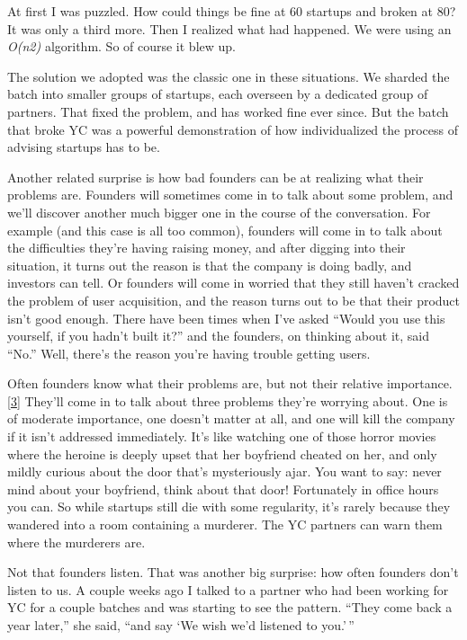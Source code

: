 At first I was puzzled. How could things be fine at 60 startups and
broken at 80? It was only a third more. Then I realized what had
happened. We were using an \emph{O(n2)} algorithm. So of course it blew
up.

The solution we adopted was the classic one in these situations. We
sharded the batch into smaller groups of startups, each overseen by a
dedicated group of partners. That fixed the problem, and has worked fine
ever since. But the batch that broke YC was a powerful demonstration of
how individualized the process of advising startups has to be.

Another related surprise is how bad founders can be at realizing what
their problems are. Founders will sometimes come in to talk about some
problem, and we'll discover another much bigger one in the course of the
conversation. For example (and this case is all too common), founders
will come in to talk about the difficulties they're having raising
money, and after digging into their situation, it turns out the reason
is that the company is doing badly, and investors can tell. Or founders
will come in worried that they still haven't cracked the problem of user
acquisition, and the reason turns out to be that their product isn't
good enough. There have been times when I've asked ``Would you use this
yourself, if you hadn't built it?'' and the founders, on thinking about
it, said ``No.'' Well, there's the reason you're having trouble getting
users.

Often founders know what their problems are, but not their relative
importance. {[}\hyperref[f3n]{3}{]} They'll come in to talk about three
problems they're worrying about. One is of moderate importance, one
doesn't matter at all, and one will kill the company if it isn't
addressed immediately. It's like watching one of those horror movies
where the heroine is deeply upset that her boyfriend cheated on her, and
only mildly curious about the door that's mysteriously ajar. You want to
say: never mind about your boyfriend, think about that door! Fortunately
in office hours you can. So while startups still die with some
regularity, it's rarely because they wandered into a room containing a
murderer. The YC partners can warn them where the murderers are.

Not that founders listen. That was another big surprise: how often
founders don't listen to us. A couple weeks ago I talked to a partner
who had been working for YC for a couple batches and was starting to see
the pattern. ``They come back a year later,'' she said, ``and say `We
wish we'd listened to you.'\,''

